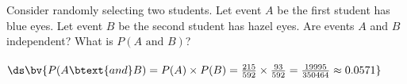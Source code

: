 \documentclass{article}
\begin{document}
\begin{flushleft}
\begin{enumalpha}
\item Consider randomly selecting two students. Let event $A$ be the first student has blue eyes. Let event $B$ be the second student has hazel eyes. Are events $A$ and $B$ independent? What is $P(A \text { and } B)$?\\
\medskip
{}\\
\bigskip
$\ds \bv{P(A \btext{ and } B) = P(A) \times P(B) = \frac {215}{592} \times \frac {93}{592} = \frac {19995}{350464} \approx 0.0571}$

\end{enumalpha}



\end{flushleft}
\end{document}
